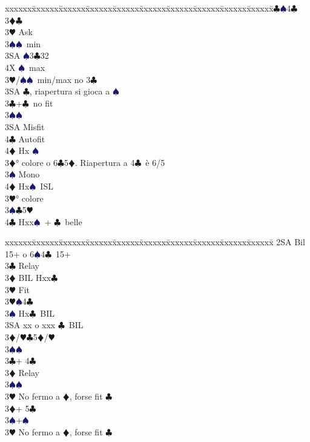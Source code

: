 \documentclass[a4paper,italian]{article}
\newcommand{\BC}{\textcolor{OliveGreen}{$\clubsuit$}}
\newcommand{\BD}{\textcolor{RedOrange}{$\vardiamondsuit$}}
\newcommand{\BH}{\textcolor{Red2}{$\varheartsuit${}}}
\newcommand{\BS}{\textcolor{MidnightBlue}{$\spadesuit${}}}
\newenvironment{bidtable}
{\begin{tabbing}

    xxxxxx\=xxxxxx\=xxxxxx\=xxxxxx\=xxxxxx\=xxxxxx\=xxxxxx\=xxxxxx\=xxxxxx\=xxxxxx\=\kill}
{\end{tabbing} }%
\begin{document}
\begin{multicols}{2}
\begin{bidtable}
        4\BC {}\BS 4\BC \-\-\\
        3\BD {}\BC \+\\
        3\BH \> Ask\+\\
        3\BS {}\BS\ min\\
        3SA \BS 3\BC 32\\
        4X \BS\ max\-\-\\
        3\BH/\BS {}\BS\ min/max no 3\BC \\
        3SA \BC , riapertura si gioca a \BS \-\\
        3\BC {}+\BC\ no fit\+\\
        3\BS {}\BS \+\\
        3SA \> Misfit\\
        4\BC \> Autofit\\
        4\BD \> Hx \BS \-\-\\
        3\BD {}° colore o 6\BC 5\BD . Riapertura a 4\BC\ è 6/5\+\\
        3\BS \> Mono\+\\
        4\BD \> Hx\BS\ ISL\-\-\\
        3\BH {}° colore \\
        3\BS {}\BC 5\BH \\
        4\BC \> Hxx\BS\ + \BC\ belle\-\\
    \end{bidtable}
    \begin{bidtable}
        2SA \> Bil 15+ o 6\BS 4\BC\ 15+\+\\
        3\BC \> Relay\+\\
        3\BD \> BIL Hxx\BC \+\\
        3\BH \> Fit\-\\
        3\BH {}\BS 4\BC \\
        3\BS \> Hx\BC\ BIL\\
        3SA \> xx o xxx \BC\ BIL\-\\
        3\BD/\BH {}\BC 5\BD /\BH \\
        3\BS {}\BS \-\\
        3\BC {}+ 4\BC \+\\
        3\BD \> Relay\\
        3\BS {}\BS \\
        3\BH \> No fermo a \BD , forse fit \BC \-\\
        3\BD {}+ 5\BC \+\\
        3\BS {}+\BS \\
        3\BH \> No fermo a \BD , forse fit \BC \-\\

\end{bidtable}
\end{multicols}
\end{document}
